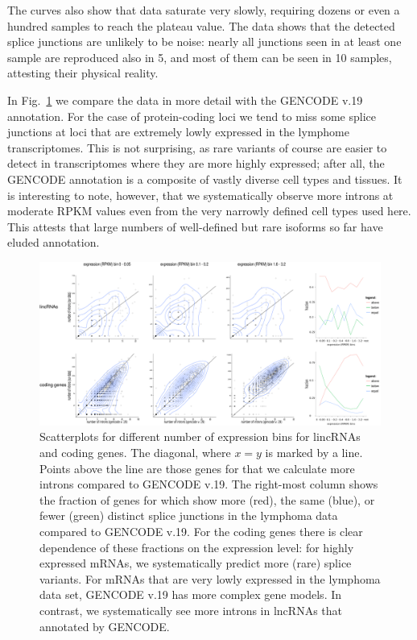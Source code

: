 \documentclass[ncrna,article,submit,moreauthors,pdftex,10pt,a4paper]{mdpi}
\begin{document}
The curves also show that data saturate very slowly, requiring dozens or
even a hundred samples to reach the plateau value. The data shows that the
detected splice junctions are unlikely to be noise: nearly all junctions
seen in at least one sample are reproduced also in 5, and most of them can
be seen in 10 samples, attesting their physical reality. 

In Fig.~\ref{fig:compare} we compare the data in more detail with the
GENCODE v.19 annotation. For the case of protein-coding loci we tend to
miss some splice junctions at loci that are extremely lowly expressed in
the lymphome transcriptomes. This is not surprising, as rare variants of
course are easier to detect in transcriptomes where they are more highly
expressed; after all, the GENCODE annotation is a composite of vastly
diverse cell types and tissues. It is interesting to note, however, that we
systematically observe more introns at moderate RPKM values even from the
very narrowly defined cell types used here. This attests that large numbers
of well-defined but rare isoforms so far have eluded annotation.

\begin{figure}[ht]
  \begin{center}
    \includegraphics[width=\textwidth]{Fig1}
  \end{center}
  \caption{Scatterplots for different number of expression bins for
    lincRNAs and coding genes.  The diagonal, where $x=y$ is marked by a
    line. Points above the line are those genes for that we calculate more
    introns compared to GENCODE v.19.  The right-most column shows the
    fraction of genes for which show more (red), the same (blue), or fewer
    (green) distinct splice junctions in the lymphoma data compared to
    GENCODE v.19.  For the coding genes there is clear dependence of these
    fractions on the expression level: for highly expressed mRNAs, we
    systematically predict more (rare) splice variants. For mRNAs that are
    very lowly expressed in the lymphoma data set, GENCODE v.19 has more
    complex gene models. In contrast, we systematically see more introns in
    lncRNAs that annotated by GENCODE.}
  \label{fig:compare}
\end{figure}
\end{document}
